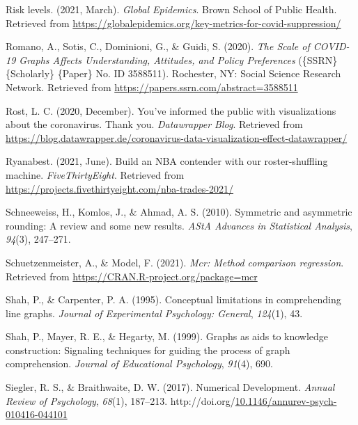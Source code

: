 \documentclass[print]{nuthesis}
\newlength{\cslhangindent}
\newenvironment{CSLReferences}[2]%
{\setlength{\parindent}{0pt}%
\everypar{\setlength{\hangindent}{\cslhangindent}}\ignorespaces}%
{\par}
\begin{document}
\begin{CSLReferences}{1}{0}
\leavevmode{}%
Risk levels. (2021, March). \emph{Global Epidemics}. Brown School of Public Health. Retrieved from \url{https://globalepidemics.org/key-metrics-for-covid-suppression/}

\leavevmode{}%
Romano, A., Sotis, C., Dominioni, G., \& Guidi, S. (2020). \emph{The {Scale} of {COVID}-19 {Graphs} {Affects} {Understanding}, {Attitudes}, and {Policy} {Preferences}} (\{SSRN\} \{Scholarly\} \{Paper\} No. ID 3588511). Rochester, NY: Social Science Research Network. Retrieved from \url{https://papers.ssrn.com/abstract=3588511}

\leavevmode{}%
Rost, L. C. (2020, December). You've informed the public with visualizations about the coronavirus. Thank you. \emph{Datawrapper Blog}. Retrieved from \url{https://blog.datawrapper.de/coronavirus-data-visualization-effect-datawrapper/}

\leavevmode{}%
Ryanabest. (2021, June). Build an NBA contender with our roster-shuffling machine. \emph{FiveThirtyEight}. Retrieved from \url{https://projects.fivethirtyeight.com/nba-trades-2021/}

\leavevmode{}%
Schneeweiss, H., Komlos, J., \& Ahmad, A. S. (2010). Symmetric and asymmetric rounding: A review and some new results. \emph{AStA Advances in Statistical Analysis}, \emph{94}(3), 247--271.

\leavevmode{}%
Schuetzenmeister, A., \& Model, F. (2021). \emph{Mcr: Method comparison regression}. Retrieved from \url{https://CRAN.R-project.org/package=mcr}

\leavevmode{}%
Shah, P., \& Carpenter, P. A. (1995). Conceptual limitations in comprehending line graphs. \emph{Journal of Experimental Psychology: General}, \emph{124}(1), 43.

\leavevmode{}%
Shah, P., Mayer, R. E., \& Hegarty, M. (1999). Graphs as aids to knowledge construction: Signaling techniques for guiding the process of graph comprehension. \emph{Journal of Educational Psychology}, \emph{91}(4), 690.

\leavevmode{}%
Siegler, R. S., \& Braithwaite, D. W. (2017). Numerical {Development}. \emph{Annual Review of Psychology}, \emph{68}(1), 187--213. http://doi.org/\href{https://doi.org/10.1146/annurev-psych-010416-044101}{10.1146/annurev-psych-010416-044101}


\end{CSLReferences}
\end{document}
